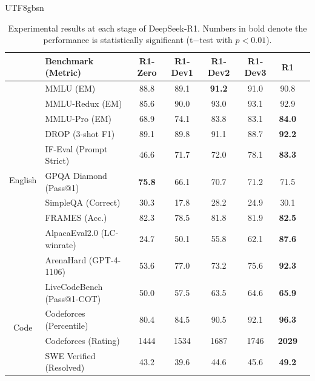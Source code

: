 \documentclass[11pt, a4paper, logo, copyright, nonumbering]{deepseek}
\begin{document}
\begin{CJK*}{UTF8}{gbsn}
\begin{table}[h]
    \centering
    \small
    \setlength{\tabcolsep}{1.9pt}
    \caption{ Experimental results at each stage of DeepSeek-R1. Numbers in bold denote the performance is statistically significant  (t$-$test with $p < 0.01$).}
    \begin{tabular}{@{}c l | c c  c  c |c c@{}}
    \toprule
     & \textbf{Benchmark {\tiny (Metric)}} & \textbf{R1-Zero} & \textbf{R1-Dev1}  & \textbf{R1-Dev2}& \textbf{R1-Dev3} & \textbf{R1} \\
    \midrule
    \multirow{10}{*}{English}& MMLU {\tiny (EM)} & 88.8 & 89.1 & \textbf{91.2} & 91.0  &   90.8\\
     & MMLU-Redux {\tiny (EM)}& 85.6 &90.0 & 93.0 & 93.1 &  92.9 \\
    & MMLU-Pro {\tiny (EM)}  & 68.9 & 74.1 & 83.8 & 83.1 &  \textbf{84.0} \\
    & DROP {\tiny (3-shot F1)}  & 89.1 &89.8 & 91.1 & 88.7  &  \textbf{92.2}\\
    & IF-Eval {\tiny (Prompt Strict)}  & 46.6& 71.7 & 72.0 & 78.1 & \textbf{83.3} \\
    & GPQA Diamond {\tiny (Pass@1)}  & \textbf{75.8} &66.1 & 70.7 &  71.2 &  71.5&  \\
    & SimpleQA {\tiny (Correct)}   & 30.3 & 17.8 & 28.2 & 24.9  &  {30.1} \\
     & FRAMES {\tiny (Acc.)}    & 82.3 & 78.5 & 81.8 & 81.9 &   \textbf{82.5}\\
      & AlpacaEval2.0 {\tiny (LC-winrate)}   & 24.7 & 50.1 & 55.8 & 62.1  &   \textbf{87.6}\\
       & ArenaHard {\tiny (GPT-4-1106)}   & 53.6 & 77.0 & 73.2 & 75.6 &   \textbf{92.3}\\
    \midrule
    \multirow{7}{*}{Code} & LiveCodeBench {\tiny (Pass@1-COT)}   & 50.0 & 57.5&63.5 & 64.6  &   \textbf{65.9} \\
    & Codeforces {\tiny (Percentile)}  & 80.4 & 84.5& 90.5& 92.1  &   \textbf{96.3} \\
    & Codeforces {\tiny (Rating)}  & 1444 &1534 & 1687& 1746  &   \textbf{2029} \\
    & SWE Verified {\tiny (Resolved)}  & 43.2 & 39.6&44.6 &  45.6 &   \textbf{49.2}\\

\end{tabular}
\end{table}
\end{CJK*}
\end{document}
